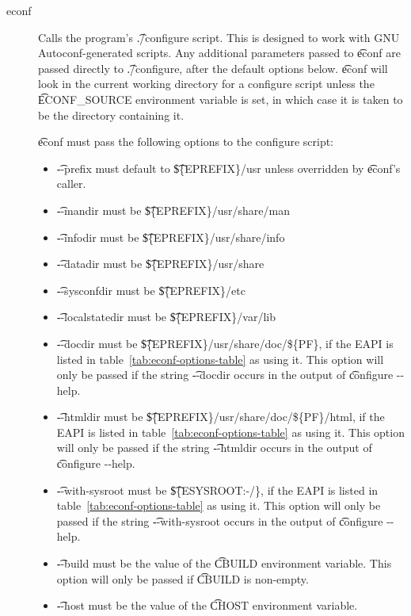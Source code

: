 \begin{description}
\item[econf] Calls the program's \t{./configure} script. This is designed to work with GNU
    Autoconf-generated scripts. Any additional parameters passed to \t{econf} are passed directly
    to \t{./configure}, after the default options below. \t{econf} will look in the current working
    directory for a configure script unless the \t{ECONF_SOURCE} environment variable is set,
    in which case it is taken to be the directory containing it.

     \t{econf} must pass the following options to the configure script:
    \begin{itemize}
    \item \t{-{}-prefix} must default to \t{\$\{EPREFIX\}/usr} unless overridden by \t{econf}'s
        caller.
    \item \t{-{}-mandir} must be \t{\$\{EPREFIX\}/usr/share/man}
    \item \t{-{}-infodir} must be \t{\$\{EPREFIX\}/usr/share/info}
    \item \t{-{}-datadir} must be \t{\$\{EPREFIX\}/usr/share}
    \item \t{-{}-sysconfdir} must be \t{\$\{EPREFIX\}/etc}
    \item \t{-{}-localstatedir} must be \t{\$\{EPREFIX\}/var/lib}
    \item \t{-{}-docdir} must be \t{\$\{EPREFIX\}/usr/share/doc/\$\{PF\}}, if the EAPI is listed in
        table~\ref{tab:econf-options-table} as using it. This option will only be passed if the
        string \t{-{}-docdir} occurs in the output of \t{configure -{}-help}.
    \item \t{-{}-htmldir} must be \t{\$\{EPREFIX\}/usr/share/doc/\$\{PF\}/html}, if the EAPI is
        listed in table~\ref{tab:econf-options-table} as using it. This option will only be passed
        if the string \t{-{}-htmldir} occurs in the output of \t{configure -{}-help}.
    \item \t{-{}-with-sysroot} must be \t{\$\{ESYSROOT:-/\}}, if the EAPI is listed in
        table~\ref{tab:econf-options-table} as using it. This option will only be passed if the
        string \t{-{}-with-sysroot} occurs in the output of \t{configure -{}-help}.
    \item \t{-{}-build} must be the value of the \t{CBUILD} environment variable. This option will
        only be passed if \t{CBUILD} is non-empty.
    \item \t{-{}-host} must be the value of the \t{CHOST} environment variable.

\end{itemize}
\end{description}
